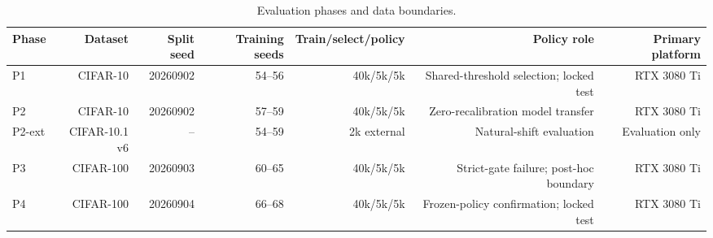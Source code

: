 \begin{table}[t]
\centering
\small
\caption{Evaluation phases and data boundaries.}
\label{tab:protocol}
\begin{tabular}{lrrrrrr}
\toprule
Phase & Dataset & Split seed & Training seeds & Train/select/policy & Policy role & Primary platform \\
\midrule
P1 & CIFAR-10 & 20260902 & 54--56 & 40k/5k/5k & Shared-threshold selection; locked test & RTX 3080 Ti \\
P2 & CIFAR-10 & 20260902 & 57--59 & 40k/5k/5k & Zero-recalibration model transfer & RTX 3080 Ti \\
P2-ext & CIFAR-10.1 v6 & -- & 54--59 & 2k external & Natural-shift evaluation & Evaluation only \\
P3 & CIFAR-100 & 20260903 & 60--65 & 40k/5k/5k & Strict-gate failure; post-hoc boundary & RTX 3080 Ti \\
P4 & CIFAR-100 & 20260904 & 66--68 & 40k/5k/5k & Frozen-policy confirmation; locked test & RTX 3080 Ti \\
\bottomrule
\end{tabular}
\end{table}
